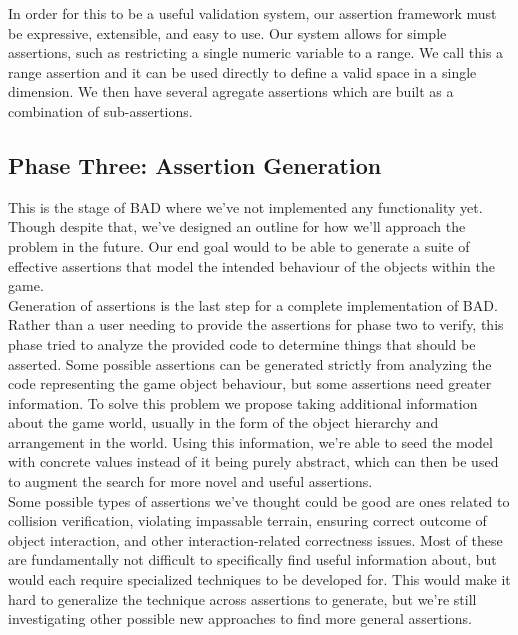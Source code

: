 \documentclass[letterpaper,twocolumn,10pt]{article}
\begin{document}
In order for this to be a useful validation system, our assertion framework must be expressive, extensible, and easy to use. Our system allows for simple assertions, such as restricting a single numeric variable to a range. We call this a range assertion and it can be used directly to define a valid space in a single dimension. We then have several agregate assertions which are built as a combination of sub-assertions. 

\subsection{Phase Three: Assertion Generation}

This is the stage of BAD where we've not implemented any functionality yet. Though despite that, we've designed an outline for how we'll approach the problem in the future. Our end goal would to be able to generate a suite of effective assertions that model the intended behaviour of the objects within the game. \\

Generation of assertions is the last step for a complete implementation of BAD. Rather than a user needing to provide the assertions for phase two to verify, this phase tried to analyze the provided code to determine things that should be asserted. Some possible assertions can be generated strictly from analyzing the code representing the game object behaviour, but some assertions need greater information. To solve this problem we propose taking additional information about the game world, usually in the form of the object hierarchy and arrangement in the world. Using this information, we're able to seed the model with concrete values instead of it being purely abstract, which can then be used to augment the search for more novel and useful assertions. \\

Some possible types of assertions we've thought could be good are ones related to collision verification, violating impassable terrain, ensuring correct outcome of object interaction, and other interaction-related correctness issues. Most of these are fundamentally not difficult to specifically find useful information about, but would each require specialized techniques to be developed for. This would make it hard to generalize the technique across assertions to generate, but we're still investigating other possible new approaches to find more general assertions. \\
\end{document}
